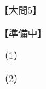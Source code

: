 \documentclass[../../../../hsm_tok_a.tex]{subfiles}
\begin{document}
    【大問5】

    【準備中】

    （1）


    （2）

\end{document}
